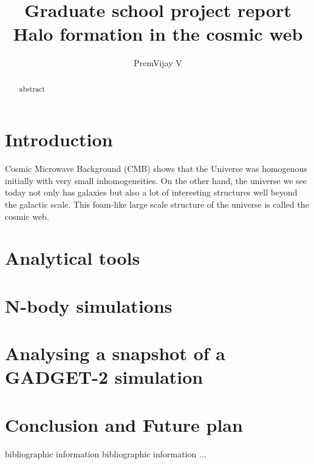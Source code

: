 \documentclass[12pt]{article}
\title{Graduate school project report\\
	Halo formation in the cosmic web}
\author{PremVijay V}
\begin{document}
\maketitle

\begin{abstract}
abstract
\end{abstract}

\section{Introduction}
Cosmic Microwave Background (CMB) shows that the Universe was homogenous initially with very small inhomogeneities. On the other hand, the universe we see today not only has galaxies but also a lot of interesting structures well beyond the galactic scale. This foam-like large scale structure of the universe is called the cosmic web.



\section{Analytical tools}



\section{N-body simulations}


\section{Analysing a snapshot of a GADGET-2 simulation}

\section{Conclusion and Future plan}




\begin{thebibliography}{widest entry}
 bibliographic information
 bibliographic information
   ...
\end{thebibliography}
\end{document}
